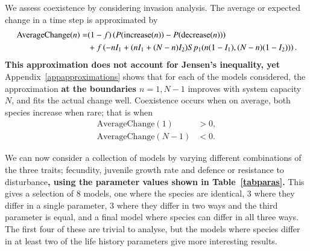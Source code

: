 We assess coexistence by considering invasion analysis. The average or expected change in a time step is approximated by
\begin{align}
\label{ac}
\text{AverageChange}(n)=&(1-f)\left(P(\text{increase}(n))-P(\text{decrease}(n))\right)  \\
&+f\left(-nI_1 +(nI_1+(N-n)I_2)Sp_1(n(1-I_1),(N-n)(1-I_2))\right).\notag
\end{align}
\textbf{This approximation does not account for Jensen's inequality, yet }Appendix~\ref{appapproximations} shows that for each of the models considered, the approximation \textbf{at the boundaries $n=1,N-1$} improves with system capacity $N$, and fits the actual change well. Coexistence occurs when on average, both species increase when rare; that is when
\begin{align}
\label{avch1}\text{AverageChange}(1)&>0,\\
\label{avchn-1}\text{AverageChange}(N-1)&<0. \end{align}

We can now consider a collection of models by varying different combinations of the three traits; fecundity, juvenile growth rate and defence or resistance to disturbance\textbf{, using the parameter values shown in Table~\ref{tabparas}.} This gives a selection of 8 models, one where the species are identical, 3 where they differ in a single parameter, 3 where they differ in two ways and the third parameter is equal, and a final model where species can differ in all three ways. The first four of these are trivial to analyse, but the models where species differ in at least two of the life history parameters give more interesting results.

